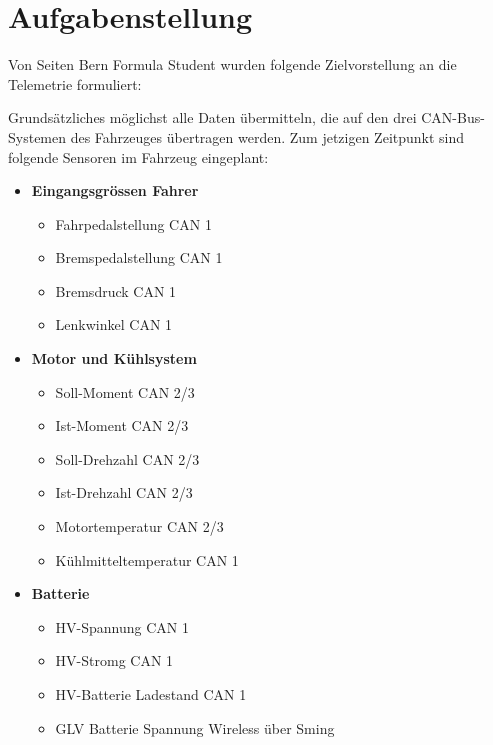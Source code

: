 \chapter{Aufgabenstellung}
\label{chap:aufgabenstellung}

Von Seiten Bern Formula Student wurden folgende Zielvorstellung an die Telemetrie formuliert:

Grundsätzliches möglichst alle Daten übermitteln, die auf den drei CAN-Bus-Systemen des Fahrzeuges übertragen werden. Zum jetzigen Zeitpunkt sind folgende Sensoren im Fahrzeug eingeplant:

\begin{itemize}
	\itemsep 1pt \parskip 0pt \parsep 0pt
	\item \textbf{Eingangsgrössen Fahrer}		
		\begin{itemize}
			\itemsep 1pt \parskip 0pt \parsep 0pt
			\item Fahrpedalstellung		CAN 1
			\item Bremspedalstellung	CAN 1
			\item Bremsdruck			CAN 1
			\item Lenkwinkel			CAN 1
		\end{itemize}
	\item \textbf{Motor und Kühlsystem}		
		\begin{itemize}
			\itemsep 1pt \parskip 0pt \parsep 0pt
			\item Soll-Moment			CAN 2/3
			\item Ist-Moment			CAN 2/3
			\item Soll-Drehzahl			CAN 2/3
			\item Ist-Drehzahl			CAN 2/3
			\item Motortemperatur		CAN 2/3
			\item Kühlmitteltemperatur	CAN 1
		\end{itemize}		
	\item \textbf{Batterie}		
		\begin{itemize}
			\itemsep 1pt \parskip 0pt \parsep 0pt
			\item HV-Spannung				CAN 1
			\item HV-Stromg					CAN 1
			\item HV-Batterie Ladestand		CAN 1
			\item GLV Batterie Spannung		Wireless über Sming
		\end{itemize}
					

\end{itemize}
